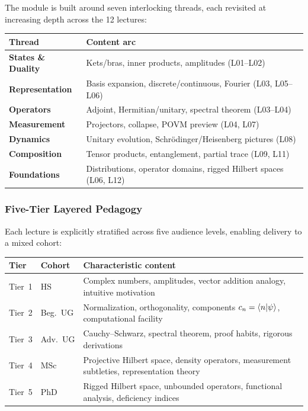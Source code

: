 \documentclass[11pt,a4paper]{article}
\begin{document}
The module is built around seven interlocking threads, each revisited at increasing depth
across the 12 lectures:

\begin{center}
\begin{tabular}{lp{10cm}}
\toprule
\textbf{Thread} & \textbf{Content arc}\\
\midrule
\textbf{States \& Duality} & Kets/bras, inner products, amplitudes (L01--L02)\\
\textbf{Representation} & Basis expansion, discrete/continuous, Fourier (L03, L05--L06)\\
\textbf{Operators} & Adjoint, Hermitian/unitary, spectral theorem (L03--L04)\\
\textbf{Measurement} & Projectors, collapse, POVM preview (L04, L07)\\
\textbf{Dynamics} & Unitary evolution, Schr\"odinger/Heisenberg pictures (L08)\\
\textbf{Composition} & Tensor products, entanglement, partial trace (L09, L11)\\
\textbf{Foundations} & Distributions, operator domains, rigged Hilbert spaces (L06, L12)\\
\bottomrule
\end{tabular}
\end{center}

\subsubsection*{Five-Tier Layered Pedagogy}

Each lecture is explicitly stratified across five audience levels, enabling delivery
to a mixed cohort:

\begin{center}
\begin{tabular}{llp{9cm}}
\toprule
\textbf{Tier} & \textbf{Cohort} & \textbf{Characteristic content}\\
\midrule
Tier~1 & HS       & Complex numbers, amplitudes, vector addition analogy,
                    intuitive motivation\\
Tier~2 & Beg.\ UG & Normalization, orthogonality, components $c_n=\braket{n|\psi}$,
                    computational facility\\
Tier~3 & Adv.\ UG & Cauchy--Schwarz, spectral theorem, proof habits, rigorous derivations\\
Tier~4 & MSc      & Projective Hilbert space, density operators, measurement subtleties,
                    representation theory\\
Tier~5 & PhD      & Rigged Hilbert space, unbounded operators, functional analysis,
                    deficiency indices\\
\bottomrule
\end{tabular}
\end{center}
\end{document}
